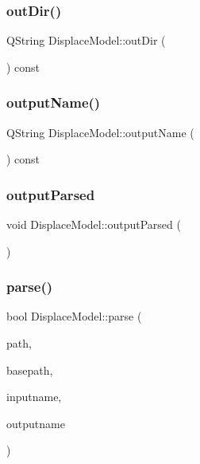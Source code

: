 \subsubsection{\texorpdfstring{outDir()}{outDir()}}
{\footnotesize\ttfamily Q\+String Displace\+Model\+::out\+Dir (\begin{DoxyParamCaption}{ }\end{DoxyParamCaption}) const\hspace{0.3cm}{\ttfamily [inline]}}

\mbox{\label{class_displace_model_a18dd33b709f112808f471edd0bc3a36a}} 
\subsubsection{\texorpdfstring{outputName()}{outputName()}}
{\footnotesize\ttfamily Q\+String Displace\+Model\+::output\+Name (\begin{DoxyParamCaption}{ }\end{DoxyParamCaption}) const\hspace{0.3cm}{\ttfamily [inline]}}

\mbox{\label{class_displace_model_a0c20da595cd366606c388b5895a5c81a}} 
\subsubsection{\texorpdfstring{outputParsed}{outputParsed}}
{\footnotesize\ttfamily void Displace\+Model\+::output\+Parsed (\begin{DoxyParamCaption}{ }\end{DoxyParamCaption})\hspace{0.3cm}{\ttfamily [signal]}}

\mbox{\label{class_displace_model_a375f6f9df87d13214aa89f30daee9c96}} 
\subsubsection{\texorpdfstring{parse()}{parse()}}
{\footnotesize\ttfamily bool Displace\+Model\+::parse (\begin{DoxyParamCaption}\item[{const Q\+String \&}]{path,  }\item[{Q\+String $\ast$}]{basepath,  }\item[{Q\+String $\ast$}]{inputname,  }\item[{Q\+String $\ast$}]{outputname }\end{DoxyParamCaption})\hspace{0.3cm}{\ttfamily [protected]}}

